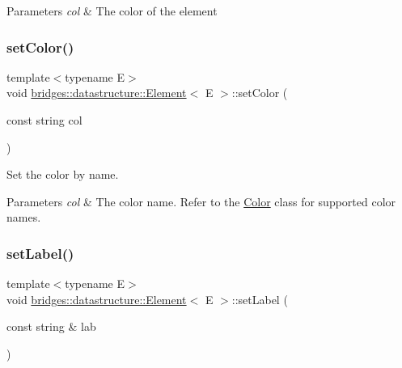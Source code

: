 \begin{DoxyParams}{Parameters}
{\em col} & The color of the element \\
\hline
\end{DoxyParams}
\mbox{\label{classbridges_1_1datastructure_1_1_element_a3792c8d514f4d644d739c6124f26bcbf}} 
\subsubsection{\texorpdfstring{setColor()}{setColor()}\hspace{0.1cm}{\footnotesize\ttfamily [2/2]}}
{\footnotesize\ttfamily template$<$typename E$>$ \\
void \mbox{\hyperlink{classbridges_1_1datastructure_1_1_element}{bridges\+::datastructure\+::\+Element}}$<$ E $>$\+::set\+Color (\begin{DoxyParamCaption}\item[{const string}]{col }\end{DoxyParamCaption})\hspace{0.3cm}{\ttfamily [inline]}}



Set the color by name. 


\begin{DoxyParams}{Parameters}
{\em col} & The color name. Refer to the \mbox{\hyperlink{classbridges_1_1datastructure_1_1_color}{Color}} class for supported color names. \\
\hline
\end{DoxyParams}
\mbox{\label{classbridges_1_1datastructure_1_1_element_a3a1fe4e3aa100125710c30f6e401e8c3}} 
\subsubsection{\texorpdfstring{setLabel()}{setLabel()}}
{\footnotesize\ttfamily template$<$typename E$>$ \\
void \mbox{\hyperlink{classbridges_1_1datastructure_1_1_element}{bridges\+::datastructure\+::\+Element}}$<$ E $>$\+::set\+Label (\begin{DoxyParamCaption}\item[{const string \&}]{lab }\end{DoxyParamCaption})\hspace{0.3cm}{\ttfamily [inline]}}

